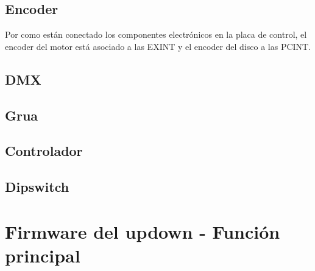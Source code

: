 \subsection{Encoder}

Por como están conectado los componentes electrónicos en la placa de control, el encoder del motor está asociado a las EXINT y el encoder del disco a las PCINT.

\subsection{DMX}

\subsection{Grua}

\subsection{Controlador}

\subsection{Dipswitch}


\section{Firmware del updown - Función principal} \label{sec:\thesection}


